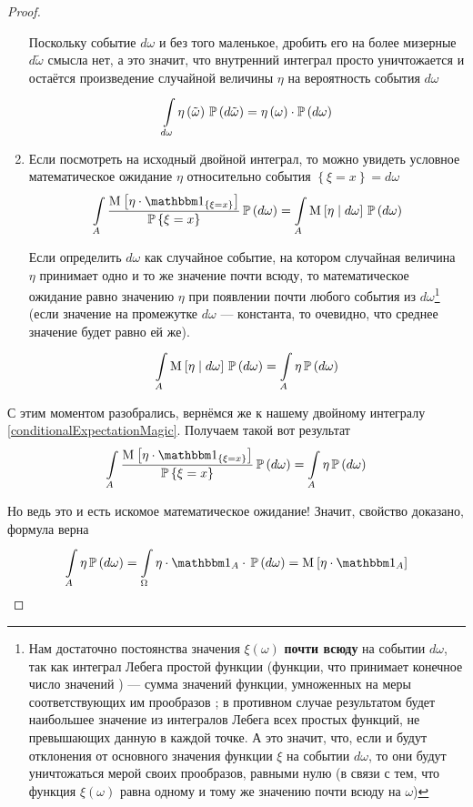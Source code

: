 \begin{proof}
\begin{enumerate}[label=\bfseries Формулировка \arabic*:]
        Поскольку событие $d\omega$ и без того маленькое,
        дробить его на более мизерные $d\tilde{\omega}$ смысла нет,
        а это значит, что внутренний интеграл просто уничтожается
        и остаётся произведение случайной величины $\eta$
        на вероятность события $d\omega$
        $$\integrall{d\omega}{\probability{d\tilde{\omega}}}{
            \eta\left( \tilde{\omega} \right)}
            = \eta\left( \omega \right) \cdot \probability{d\omega}$$
    \item
        Если посмотреть на исходный двойной интеграл,
        то можно увидеть условное математическое ожидание $\eta$
        относительно события $\left\{ \xi = x \right\}=d\omega$
        $$\integrall{A}{\probability{d\omega}}{
            \frac{\Mean{\eta \cdot \Indicatorof{\xi = x}}}
                    {\Probability{\xi = x}}}
            = \integrall{A}{\probability{d\omega}}{\Mean{\eta \mid d\omega}}$$

        Если определить $d\omega$ как случайное событие,
        на котором случайная величина $\eta$ принимает
        одно и то же значение почти всюду,
        то математическое ожидание равно значению $\eta$
        при появлении почти любого события из $d\omega$\footnote{Нам достаточно
        постоянства значения $\xi\left( \omega \right)$ \textbf{почти всюду}
        на событии $d\omega$,
        так как интеграл Лебега простой функции (функции,
        что принимает конечное число значений \cite[стр.~53]{DorogovtsevIT})
        --- сумма значений функции, умноженных на меры
        соответствующих им прообразов \cite[стр.~69]{DorogovtsevIT};
        в противном случае результатом будет наибольшее значение
        из интегралов Лебега всех простых функций,
        не превышающих данную в каждой точке.
        А это значит, что, если и будут отклонения от основного значения функции
        $\xi$ на событии $d\omega$,
        то они будут уничтожаться мерой своих прообразов, равными нулю
        (в связи с тем, что функция $\xi\left( \omega \right)$
        равна одному и тому же значению почти всюду на $\omega$)
        }
        (если значение на промежутке $d\omega$ --- константа,
        то очевидно, что среднее значение будет равно ей же).
        $$\integrall{A}{\probability{d\omega}}{\Mean{\eta \mid d\omega}}
            = \integrall{A}{\probability{d\omega}}{\eta}$$
\end{enumerate}

С этим моментом разобрались, вернёмся же к нашему двойному интегралу
\eqref{conditionalExpectationMagic}.
Получаем такой вот результат
$$\integrall{A}{\probability{d\omega}}{
    \frac{\Mean{\eta \cdot \Indicatorof{\xi = x}}}
        {\Probability{\xi = x}}}
    = \integrall{A}{\probability{d\omega}}{\eta}$$

Но ведь это и есть искомое математическое ожидание!
Значит, свойство доказано, формула верна
$$\integrall{A}{\probability{d\omega}}{\eta}
    = \integrall{\Omega}{\probability{d\omega}}{
        \eta \cdot \indicatorof{A} \cdot}
    = \Mean{ \eta \cdot \indicatorof{A} }$$
\end{proof}

